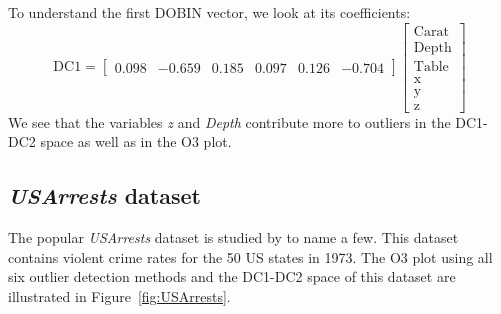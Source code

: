 \documentclass[11pt]{article}
\begin{document}
\noindent
To understand the first DOBIN vector, we look at its coefficients:
\begin{equation}\label{eq:ResWithVis2}
    \text{DC1} = \begin{bmatrix}
    0.098 & -0.659 &  0.185 & 0.097  & 0.126 & -0.704  
    \end{bmatrix}
    \begin{bmatrix}
    \text{Carat} \\
    \text{Depth} \\
    \text{Table} \\
    \text{x} \\
    \text{y} \\
    \text{z}
    \end{bmatrix}
\end{equation}
We see that the variables \textit{z} and \textit{Depth} contribute more  to  outliers in the DC1-DC2 space as well as in the O3 plot. 


\subsection{\textit{USArrests} dataset}\label{sec:ResWithVis3}
The popular \textit{USArrests} dataset  is studied by \cite{bailey1995interactive, sarkar2008labels, yaminiviolent} to name a few. This dataset contains violent crime rates for the 50 US states in 1973. The O3 plot using all six outlier detection methods and the DC1-DC2 space of this dataset are illustrated in Figure~\ref{fig:USArrests}. 
\end{document}

